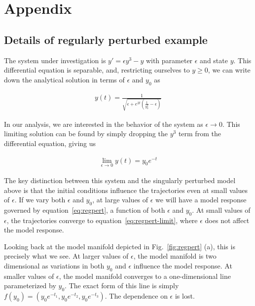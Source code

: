 \chapter{Appendix}

\section{Details of regularly perturbed example \label{app:regpert}}

The system under investigation is $y' = \epsilon y^3 - y$ with
parameter $\epsilon$ and state $y$. This differential equation is
separable, and, restricting ourselves to $y \ge 0$, we can write down
the analytical solution in terms of $\epsilon$ and $y_0$ as

\begin{align}
  y(t) = \frac{1}{\sqrt{\epsilon + e^{2 t} \left(\frac{1}{y_0^2} -
  \epsilon \right)}}
\label{eq:regpert}
\end{align}

In our analysis, we are interested in the behavior of the system as
$\epsilon \rightarrow 0$. This limiting solution can be found by
simply dropping the $y^3$ term from the differential equation, giving
us

\begin{align}
  \lim_{\epsilon \rightarrow 0} y(t) = y_0 e^{-t}
\label{eq:regpert-limit}
\end{align}

The key distinction between this system and the singularly perturbed
model above is that the initial conditions influence the trajectories
even at small values of $\epsilon$. If we vary both $\epsilon$ and
$y_0$, at large values of $\epsilon$ we will have a model response
governed by equation~\ref{eq:regpert}, a function of both $\epsilon$
and $y_0$. At small values of $\epsilon$, the trajectories converge
to equation~\ref{eq:regpert-limit}, where $\epsilon$ does not
affect the model response.

Looking back at the model manifold depicted in
Fig.~\ref{fig:regpert} (a), this is precisely what we see. At larger
values of $\epsilon$, the model manifold is two dimensional as
variations in both $y_0$ and $\epsilon$ influence the model
response. At smaller values of $\epsilon$, the model manifold
converges to a one-dimensional line parameterized by $y_0$. The exact
form of this line is simply $f(y_0)= \left( y_0 e^{-t_1}, y_0 e^{-t_2}, y_0
  e^{-t_3} \right)$. The dependence on $\epsilon$ is lost.

